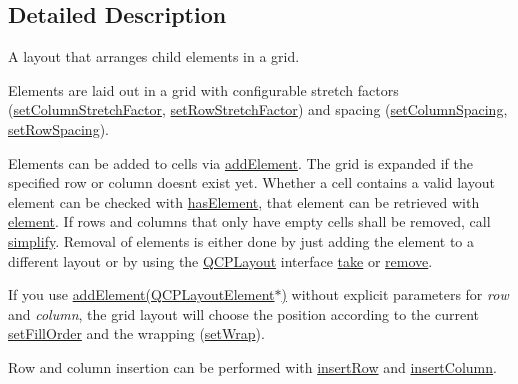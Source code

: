 \subsection{Detailed Description}
A layout that arranges child elements in a grid. 

Elements are laid out in a grid with configurable stretch factors (\mbox{\hyperlink{class_q_c_p_layout_grid_ae38f31a71687b9d7ee3104852528fb50}{set\+Column\+Stretch\+Factor}}, \mbox{\hyperlink{class_q_c_p_layout_grid_a7b0273de5369bd93d942edbaf5b166ec}{set\+Row\+Stretch\+Factor}}) and spacing (\mbox{\hyperlink{class_q_c_p_layout_grid_a3a49272aba32bb0fddc3bb2a45a3dba0}{set\+Column\+Spacing}}, \mbox{\hyperlink{class_q_c_p_layout_grid_aaef2cd2d456197ee06a208793678e436}{set\+Row\+Spacing}}).

Elements can be added to cells via \mbox{\hyperlink{class_q_c_p_layout_grid_adff1a2ca691ed83d2d24a4cd1fe17012}{add\+Element}}. The grid is expanded if the specified row or column doesn\textquotesingle{}t exist yet. Whether a cell contains a valid layout element can be checked with \mbox{\hyperlink{class_q_c_p_layout_grid_ab0cf4f7edc9414a3bfaddac0f46dc0a0}{has\+Element}}, that element can be retrieved with \mbox{\hyperlink{class_q_c_p_layout_grid_a602b426609b4411cf6a93c3ddf3a381a}{element}}. If rows and columns that only have empty cells shall be removed, call \mbox{\hyperlink{class_q_c_p_layout_grid_a38621ca7aa633b6a9a88617df7f08672}{simplify}}. Removal of elements is either done by just adding the element to a different layout or by using the \mbox{\hyperlink{class_q_c_p_layout}{Q\+C\+P\+Layout}} interface \mbox{\hyperlink{class_q_c_p_layout_grid_aee961c2eb6cf8a85dcbc5a7d7b6c1a00}{take}} or \mbox{\hyperlink{class_q_c_p_layout_a6c58f537d8086f352576ab7c5b15d0bc}{remove}}.

If you use \mbox{\hyperlink{class_q_c_p_layout_grid_a4c44025dd25acd27e053cadfd448ad7b}{add\+Element(\+Q\+C\+P\+Layout\+Element$\ast$)}} without explicit parameters for {\itshape row} and {\itshape column}, the grid layout will choose the position according to the current \mbox{\hyperlink{class_q_c_p_layout_grid_affc2f3cfd22f28698c5b29b960d2a391}{set\+Fill\+Order}} and the wrapping (\mbox{\hyperlink{class_q_c_p_layout_grid_ab36af18d77e4428386d02970382ee598}{set\+Wrap}}).

Row and column insertion can be performed with \mbox{\hyperlink{class_q_c_p_layout_grid_a48af3dd7c3a653d9c3d7dd99bd02e838}{insert\+Row}} and \mbox{\hyperlink{class_q_c_p_layout_grid_a1e880a321dbe8b43b471ccd764433dc4}{insert\+Column}}. 

